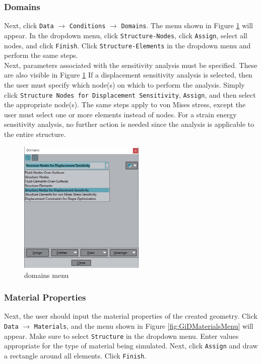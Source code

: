\subsubsection{Domains}
Next, click \texttt{Data} $\rightarrow$ \texttt{Conditions} $\rightarrow$ \texttt{Domains}. The menu shown in Figure \ref{fig:GiDDomainsMenu} will appear. In the dropdown menu, click \texttt{Structure-Nodes}, click \texttt{Assign}, select all nodes, and click \texttt{Finish}. Click \texttt{Structure-Elements} in the dropdown menu and perform the same steps.\\[6pt]
Next, parameters associated with the sensitivity analysis must be specified. These are also visible in Figure \ref{fig:GiDDomainsMenu} If a displacement sensitivity analysis is selected, then the user must specify which node(s) on which to perform the analysis. Simply click \texttt{Structure Nodes for Displacement Sensitivity}, \texttt{Assign}, and then select the appropriate node(s). The same steps apply to von Mises stress, except the user must select one or more elements instead of nodes. For a strain energy sensitivity analysis, no further action is needed since the analysis is applicable to the entire structure.
\begin{figure}[ht]
  \centering
  \includegraphics[width=60mm]{images/GiD_domains.png}
  \caption{domains menu}
  \label{fig:GiDDomainsMenu}
\end{figure}

\subsubsection{Material Properties}
Next, the user should input the material properties of the created geometry. Click \texttt{Data} $\rightarrow$ \texttt{Materials}, and the menu shown in Figure \ref{fig:GiDMaterialsMenu} will appear. Make sure to select \texttt{Structure} in the dropdown menu. Enter values appropriate for the type of material being simulated. Next, click \texttt{Assign} and draw a rectangle around all elements. Click \texttt{Finish}.


